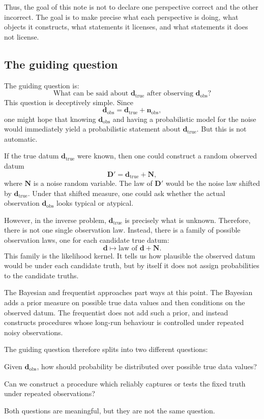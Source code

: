 \documentclass[11pt]{article}
\newcommand{\Dobsrand}{\mathbf D'}
\newcommand{\Nrand}{\mathbf N}
\newcommand{\dtrue}{\mathbf d_{\mathrm{true}}}
\newcommand{\dobs}{\mathbf d_{\mathrm{obs}}}
\newcommand{\nobs}{\mathbf n_{\mathrm{obs}}}
\begin{document}
Thus, the goal of this note is not to declare one perspective correct and the other incorrect. The goal is to make precise what each perspective is doing, what objects it constructs, what statements it licenses, and what statements it does not license.

\subsection{The guiding question}

The guiding question is:
\[
    \text{What can be said about } \dtrue
    \text{ after observing } \dobs?
\]
This question is deceptively simple. Since
\[
    \dobs=\dtrue+\nobs,
\]
one might hope that knowing \(\dobs\) and having a probabilistic model for the noise would immediately yield a probabilistic statement about \(\dtrue\). But this is not automatic.

If the true datum \(\dtrue\) were known, then one could construct a random observed datum
\[
    \Dobsrand=\dtrue+\Nrand,
\]
where \(\Nrand\) is a noise random variable. The law of \(\Dobsrand\) would be the noise law shifted by \(\dtrue\). Under that shifted measure, one could ask whether the actual observation \(\dobs\) looks typical or atypical.

However, in the inverse problem, \(\dtrue\) is precisely what is unknown. Therefore, there is not one single observation law. Instead, there is a family of possible observation laws, one for each candidate true datum:
\[
    \mathbf d
    \longmapsto
    \text{law of } \mathbf d+\Nrand.
\]
This family is the likelihood kernel. It tells us how plausible the observed datum would be under each candidate truth, but by itself it does not assign probabilities to the candidate truths.

The Bayesian and frequentist approaches part ways at this point. The Bayesian adds a prior measure on possible true data values and then conditions on the observed datum. The frequentist does not add such a prior, and instead constructs procedures whose long-run behaviour is controlled under repeated noisy observations.

The guiding question therefore splits into two different questions:
\begin{description}[leftmargin=2.5cm,style=nextline]
    \item[Bayesian question.]
    Given \(\dobs\), how should probability be distributed over possible true data values?

    \item[Frequentist question.]
    Can we construct a procedure which reliably captures or tests the fixed truth under repeated observations?
\end{description}
Both questions are meaningful, but they are not the same question.
\end{document}
